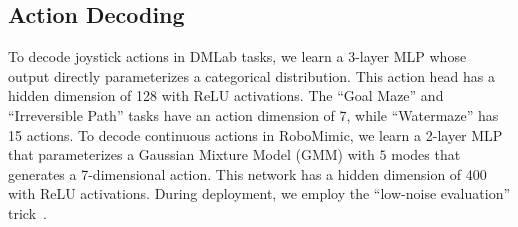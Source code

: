 

\subsection{Action Decoding}
To decode joystick actions in DMLab tasks, we learn a 3-layer MLP whose output directly parameterizes a categorical distribution. This action head has a hidden dimension of 128 with ReLU activations. 
The ``Goal Maze'' and ``Irreversible Path'' tasks have an action dimension of 7, while ``Watermaze'' has 15 actions.
To decode continuous actions in RoboMimic, we learn a 2-layer MLP that parameterizes a Gaussian Mixture Model (GMM) with $5$ modes that generates a 7-dimensional action.
This network has a hidden dimension of 400 with ReLU activations.
During deployment, we employ the ``low-noise evaluation'' trick~\citep{hoffman2020acme}.
